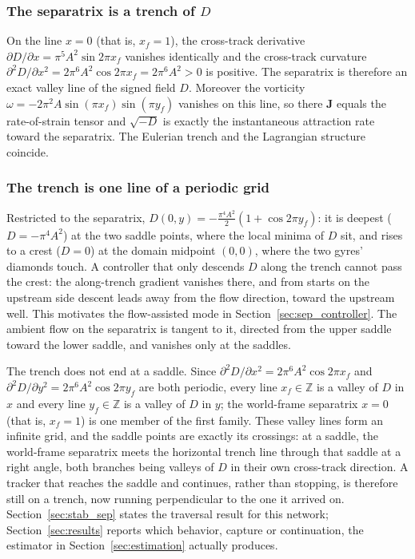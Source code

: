 \documentclass[lettersize,journal]{IEEEtran}
\begin{document}
\subsubsection{The separatrix is a trench of $D$}
On the line $x = 0$ (that is, $x_f = 1$), the cross-track derivative
$\partial D/\partial x = \pi^5 A^2 \sin 2\pi x_f$ vanishes identically
and the cross-track curvature $\partial^2 D/\partial x^2 = 2\pi^6 A^2
\cos 2\pi x_f = 2\pi^6 A^2 > 0$ is positive. The separatrix is therefore
an exact valley line of the signed field $D$. Moreover the vorticity
$\omega = -2\pi^2 A \sin(\pi x_f)\sin(\pi y_f)$ vanishes on this line, so
there $\mathbf{J}$ equals the rate-of-strain tensor and $\sqrt{-D}$ is
exactly the instantaneous attraction rate toward the separatrix. The
Eulerian trench and the Lagrangian structure coincide.

\subsubsection{The trench is one line of a periodic grid}
Restricted to the separatrix, $D(0, y) = -\tfrac{\pi^4 A^2}{2}(1 + \cos
2\pi y_f)$: it is deepest ($D = -\pi^4 A^2$) at the two saddle points,
where the local minima of $D$ sit, and rises to a crest ($D = 0$) at the
domain midpoint $(0, 0)$, where the two gyres' diamonds touch. A
controller that only descends $D$ along the trench cannot pass the
crest: the along-trench gradient vanishes there, and from starts on the
upstream side descent leads away from the flow direction, toward the
upstream well. This motivates the flow-assisted mode in
Section~\ref{sec:sep_controller}. The ambient flow on the separatrix is
tangent to it, directed from the upper saddle toward the lower saddle,
and vanishes only at the saddles.

The trench does not end at a saddle. Since $\partial^2 D/\partial x^2 =
2\pi^6 A^2 \cos 2\pi x_f$ and $\partial^2 D/\partial y^2 = 2\pi^6 A^2
\cos 2\pi y_f$ are both periodic, every line $x_f \in \mathbb{Z}$ is a
valley of $D$ in $x$ and every line $y_f \in \mathbb{Z}$ is a valley of
$D$ in $y$; the world-frame separatrix $x = 0$ (that is, $x_f = 1$) is
one member of the first family. These valley lines form an infinite
grid, and the saddle points are exactly its crossings: at a saddle, the
world-frame separatrix meets the horizontal trench line through that
saddle at a right angle, both branches being valleys of $D$ in their
own cross-track direction. A tracker that reaches the saddle and
continues, rather than stopping, is therefore still on a trench, now
running perpendicular to the one it arrived on. Section~\ref{sec:stab_sep}
states the traversal result for this network; Section~\ref{sec:results}
reports which behavior, capture or continuation, the estimator in
Section~\ref{sec:estimation} actually produces.
\end{document}

